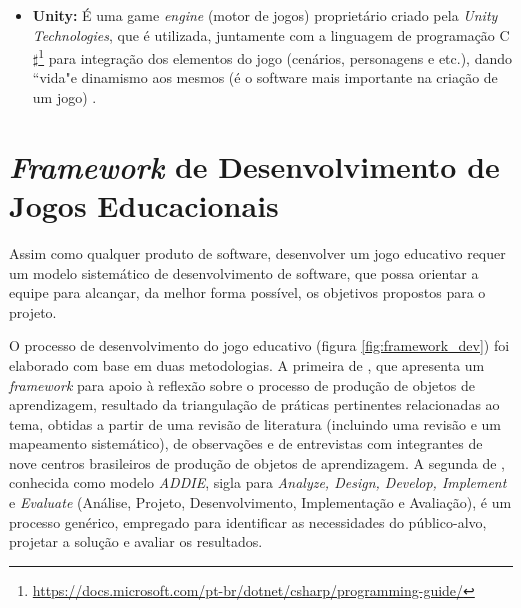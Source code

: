 \begin{itemize}
	\item \textbf{Unity:} É uma game \textit{engine} (motor de jogos) proprietário criado pela \textit{Unity Technologies}, que é utilizada, juntamente com a linguagem de programação C$\sharp$\footnote{\url{https://docs.microsoft.com/pt-br/dotnet/csharp/programming-guide/}} para integração dos elementos do jogo (cenários, personagens e etc.), dando ``vida"\space e dinamismo aos mesmos (é o software mais importante na criação de um jogo) \cite{bib:unity2018}.
	
\end{itemize}

\section{\textit{Framework} de Desenvolvimento de Jogos Educacionais}
\label{sec:desenvolvimento}

Assim como qualquer produto de software, desenvolver um jogo educativo requer um modelo sistemático de desenvolvimento de software, que possa orientar a equipe para alcançar, da melhor forma possível, os objetivos propostos para o projeto.   

O processo de desenvolvimento do jogo educativo (figura \ref{fig:framework_dev}) foi elaborado com base em duas metodologias. A primeira de , que apresenta um \textit{framework} para apoio à reflexão sobre o processo de produção de objetos de aprendizagem, resultado da triangulação de práticas pertinentes relacionadas ao tema, obtidas a partir de uma revisão de literatura (incluindo uma revisão e um mapeamento sistemático), de observações e de entrevistas com integrantes de nove centros brasileiros de produção de objetos de aprendizagem. A segunda de , conhecida como modelo \textit{ADDIE}, sigla para \textit{Analyze, Design, Develop, Implement} e \textit{Evaluate} (Análise, Projeto, Desenvolvimento, Implementação e Avaliação), é um processo genérico, empregado para identificar as necessidades do público-alvo, projetar a solução e avaliar os resultados.

